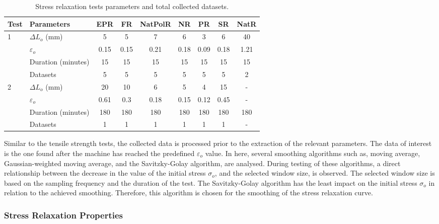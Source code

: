 \begin{table*}[htbp!]
\centering
\caption{Stress relaxation tests parameters and total collected datasets.}
\label{tbl:stressRelParameters}
\begin{tabular}{llccccccc} \toprule
Test & Parameters & EPR & FR & NatPolR & NR & PR & SR & NatR \\
\hline
\multirow{4}{*}{1}  & $\Delta L_o$ (mm)      & 5 & 5 & 7 & 6 & 3 & 6 & 40 \\
                    & $\varepsilon_o$	   & 0.15 & 0.15 & 0.21 & 0.18 & 0.09 & 0.18 & 1.21 \\
                    & Duration (minutes)    & 15 & 15 & 15 & 15 & 15 & 15 & 15 \\
                    & Datasets              & 5 & 5 & 5 & 5 & 5 & 5 & 2 \\
\hline 
\multirow{4}{*}{2}  & $\Delta L_o$ (mm)      & 20 & 10 & 6 & 5 & 4 & 15 & - \\
                    & $\varepsilon_o$	   & 0.61 & 0.3 & 0.18 & 0.15 & 0.12 & 0.45 & - \\
                    & Duration (minutes)    & 180 & 180 & 180 & 180 & 180 & 180 & 180 \\
                    & Datasets              & 1 & 1 & 1 & 1 & 1 & 1 & - \\
\bottomrule
\end{tabular}
\end{table*}

Similar to the tensile strength tests, the collected data is processed prior to the extraction of the relevant parameters. The data of interest is the one found after the machine has reached the predefined $\varepsilon_o$ value. In here, several smoothing algorithms such as, moving average, Gaussian-weighted moving average, and the Savitzky-Golay algorithm, are analysed. During testing of these algorithms, a direct relationship between the decrease in the value of the initial stress $\sigma_o$, and the selected window size, is observed. The selected window size is based on the sampling frequency and the duration of the test. The Savitzky-Golay algorithm has the least impact on the initial stress $\sigma_o$ in relation to the achieved smoothing. Therefore, this algorithm is chosen for the smoothing of the stress relaxation curve.

\subsubsection{Stress Relaxation Properties}

